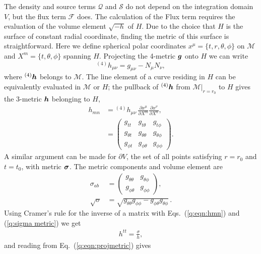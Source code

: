 The density and source terms $\mathcal{Q}$ and $\mathcal{S}$ do not depend on the integration domain $V$, but the flux term $\mathcal{F}$ does. The calculation of the Flux term requires the evaluation of the volume element $\sqrt{-h}$ of $H$. Due to the choice that $H$ is the surface of constant radial coordinate, finding the metric of this surface is straightforward. Here we define spherical polar coordinates $x^\mu = \{t,r,\theta, \phi \}$ on $\mathcal{M}$ and $X^m = \{t,\theta, \phi \}$ spanning $H$. Projecting the 4-metric $\boldsymbol g$ onto $H$ we can write
\begin{equation}
\label{q:eqn:projmetric}{}^{(4)}h_{\mu\nu} = g_{\mu\nu}-N_\mu N_\nu,
\end{equation}
where ${}^{(4)}\boldsymbol{h}$ belongs to $\mathcal{M}$. The line element of a curve residing in $H$ can be equivalently evaluated in $\mathcal{M}$ or $H$; the pullback of ${}^{(4)}\boldsymbol{h}$ from $\mathcal{M}\vert_{r=r_0}$ to $H$ gives the 3-metric $\boldsymbol h$ belonging to $H$,
\begin{align}
\label{q:induced_metric}h_{mn}  &= {}^{(4)}h_{\mu\nu}\,\frac{\partial x^\mu}{\partial X^m} \frac{\partial x^\nu}{\partial X^n}, \\
 \label{q:eqn:hmn}&= \begin{pmatrix} g_{tt} & g_{t\theta} & g_{t\phi} \\ g_{\theta t} &  g_{\theta\theta}& g_{\theta\phi} \\ g_{\phi t} & g_{\phi\theta} & g_{\phi\phi} \end{pmatrix}.
\end{align}
A similar argument can be made for $\partial V$, the set of all points satisfying $r=r_0$ and $t=t_0$, with metric $\boldsymbol{\sigma}$. The metric components and volume element are
\begin{align}
\label{q:sigma metric}\sigma_{ab} &= \begin{pmatrix} g_{\theta\theta} & g_{\theta\phi} \\ g_{\phi\theta} & g_{\phi\phi} \end{pmatrix}, \\
\label{q:sigma det}\sqrt{\sigma}  &= \sqrt{g_{\theta\theta}g_{\phi\phi} - g_{\phi\theta}g_{\theta\phi}}\,.
\end{align}
Using Cramer's rule for the inverse of a matrix with Eqs.~(\ref{q:eqn:hmn}) and (\ref{q:sigma metric}) we get
\begin{align}
\label{q:eqn:htt}h^{tt} = \frac{{\sigma}}{h},
\end{align}
and reading from Eq.~(\ref{q:eqn:projmetric}) gives 
